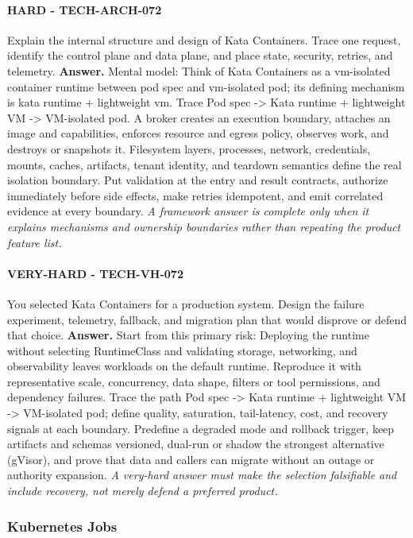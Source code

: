 \paragraph{HARD - TECH-ARCH-072} Explain the internal structure and design of Kata Containers. Trace one request, identify the control plane and data plane, and place state, security, retries, and telemetry.
\textbf{Answer.} Mental model: Think of Kata Containers as a vm-isolated container runtime between pod spec and vm-isolated pod; its defining mechanism is kata runtime + lightweight vm. Trace Pod spec -> Kata runtime + lightweight VM -> VM-isolated pod. A broker creates an execution boundary, attaches an image and capabilities, enforces resource and egress policy, observes work, and destroys or snapshots it. Filesystem layers, processes, network, credentials, mounts, caches, artifacts, tenant identity, and teardown semantics define the real isolation boundary. Put validation at the entry and result contracts, authorize immediately before side effects, make retries idempotent, and emit correlated evidence at every boundary.
\textit{A framework answer is complete only when it explains mechanisms and ownership boundaries rather than repeating the product feature list.}
\paragraph{VERY-HARD - TECH-VH-072} You selected Kata Containers for a production system. Design the failure experiment, telemetry, fallback, and migration plan that would disprove or defend that choice.
\textbf{Answer.} Start from this primary risk: Deploying the runtime without selecting RuntimeClass and validating storage, networking, and observability leaves workloads on the default runtime. Reproduce it with representative scale, concurrency, data shape, filters or tool permissions, and dependency failures. Trace the path Pod spec -> Kata runtime + lightweight VM -> VM-isolated pod; define quality, saturation, tail-latency, cost, and recovery signals at each boundary. Predefine a degraded mode and rollback trigger, keep artifacts and schemas versioned, dual-run or shadow the strongest alternative (gVisor), and prove that data and callers can migrate without an outage or authority expansion.
\textit{A very-hard answer must make the selection falsifiable and include recovery, not merely defend a preferred product.}
\subsubsection*{Kubernetes Jobs}
